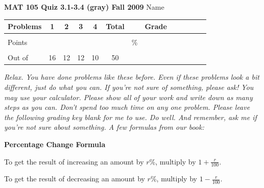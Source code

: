 \documentclass[12pt]{article}
\begin{document}
{\bf MAT 105 Quiz 3.1-3.4 (gray) Fall 2009} \hspace{.4in} {\large Name} \hrulefill

\hrulefill


\begin{center}

\begin{tabular}
{|l|c|c|c|c|c|c|c|c|c|c|c|c|} \hline

 Problems & \hspace{5 pt} 1 \hspace{5 pt}  & \hspace{5 pt} 2 \hspace{5 pt} & \hspace{5 pt} 3 \hspace{5 pt} & \hspace{5 pt} 4 \hspace{5 pt} &  \hspace{5 pt} Total  \hspace{5 pt} & &  \hspace{5 pt} Grade \hspace{5 pt}  \\ \hline
&&&&& &&\\  
Points &&&&& &    \hspace{.8in}\% &  \\ 
&&&&& && \\  \hline
Out of & 16 & 12  & 12 & 10 &50 & & \\ \hline

\end {tabular}
 
\end{center}

 \emph{Relax.  You have done problems like these before.  Even if these problems look a bit different, just do what you can.  If you're not sure of something, please ask! You may use your calculator.  Please show all of your work and write down as many steps as you can.  Don't spend too much time on any one problem.  Please leave the following grading key blank for me to use.  Do well.  And remember, ask me if you're not sure about something. A few formulas from our book:}
  \vspace{.2in}
 
  \begin{center}
\textbf{Percentage Change Formula}
\vspace{.1in}

To get the result of increasing an amount by $r$\%, multiply by $1+\frac{r}{100}.$
\vspace{.1in}

To get the result of decreasing an amount by $r$\%, multiply by $1-\frac{r}{100}.$
 \end{center}
 
\end{document}

